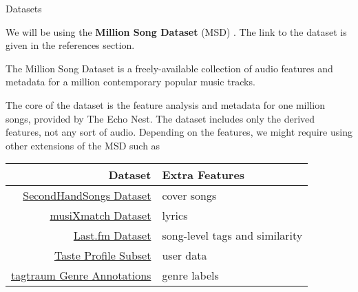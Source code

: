 \documentclass[11pt]{article}
\begin{document}
\begin{psection}{Datasets}

    We will be using the \textbf{Million Song Dataset} (MSD) \cite{IMSD}. The link to the dataset is given in the references section. \br
    
    The Million Song Dataset is a freely-available collection of audio features and metadata for a million contemporary popular music tracks. \br
    
    The core of the dataset is the feature analysis and metadata for one million songs, provided by The Echo Nest. The dataset includes only the derived features, not any sort of audio. Depending on the features, we might require using other extensions of the MSD such as

    \begin{center}
        \def\arraystretch{1.5}%
        \begin{tabular}{r | l}
        \textbf{Dataset} & \textbf{Extra Features} \\
        \hline
        \href{https://labrosa.ee.columbia.edu/millionsong/secondhand}{SecondHandSongs Dataset} & cover songs \\
        \href{https://labrosa.ee.columbia.edu/millionsong/musixmatch}{musiXmatch Dataset} & lyrics \\
        \href{https://labrosa.ee.columbia.edu/millionsong/lastfm}{Last.fm Dataset} & song-level tags and similarity \\
        \href{https://labrosa.ee.columbia.edu/millionsong/tasteprofile}{Taste Profile Subset} & user data \\
        \href{http://www.tagtraum.com/msd_genre_datasets.html}{tagtraum Genre Annotations} & genre labels  \\
        
        \end{tabular}
    \end{center}
    
\end{psection}


\clearpage
\end{document}
